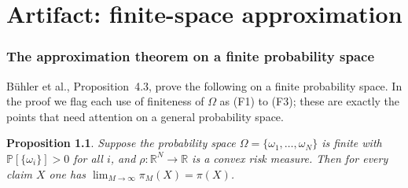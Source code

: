 \documentclass[11pt,a4paper]{report}
\numberwithin{equation}{chapter}
\theoremstyle{plain}
\newtheorem{proposition}{Proposition}[chapter]
\theoremstyle{definition}
\newcommand{\PP}{\mathbb{P}}
\newcommand{\R}{\mathbb{R}}
\begin{document}
\setcounter{chapter}{3}

\chapter{Artifact: finite-space approximation}

\subsection*{The approximation theorem on a finite probability space}

B\"uhler et al., Proposition~4.3, prove the following on a finite probability space. In the proof we flag each use of finiteness of $\Omega$ as (F1) to (F3); these are exactly the points that need attention on a general probability space.
\begin{proposition}\label{prop:finitespace}
  Suppose the probability space $\Omega=\{\omega_1,\dots,\omega_N\}$ is
  finite with $\PP[\{\omega_i\}]>0$ for all $i$, and
  $\rho:\R^N\to\R$ is a convex risk measure. Then for every
  claim $X$ one has $\displaystyle\lim_{M\to\infty}\pi_M(X)=\pi(X)$.
\end{proposition}
\end{document}
